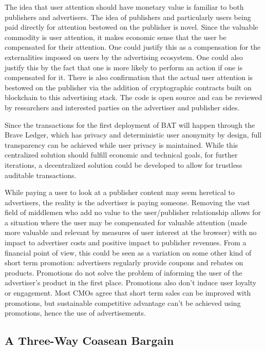 \documentclass[11pt]{article}
\begin{document}
The idea that user attention should have monetary value is familiar to
both publishers and advertisers. The idea of publishers and
particularly users being paid directly for attention bestowed on the
publisher is novel. Since the valuable commodity is user attention, it
makes economic sense that the user be compensated for their
attention. One could justify this as a compensation for the
externalities imposed on users by the advertising ecosystem. One could
also justify this by the fact that one is more likely to perform an
action if one is compensated for it. There is also confirmation that
the actual user attention is bestowed on the publisher via the
addition of cryptographic contracts built on blockchain to this
advertising stack. The code is open source and can be reviewed by
researchers and interested parties on the advertiser and publisher sides.

Since the transactions for the first deployment of \textrm{BAT} will happen
through the Brave Ledger, which has privacy and deterministic user
anonymity by design, full transparency can be achieved while user privacy is maintained. While this 
centralized solution should fulfill economic and technical goals, for further iterations, a 
decentralized solution could be developed to allow for trustless
auditable transactions.

While paying a user to look at a publisher content may seem
heretical to advertisers, the reality is the advertiser is paying
someone. Removing the vast field of middlemen who add no
value to the user/publisher relationship allows for a situation where
the user may be compensated for valuable attention (made more
valuable and relevant by measures of user interest at the browser)
with no impact to advertiser costs and positive impact to publisher
revenues. From a financial point of view, this could be seen as a
variation on some other kind of short term promotion: advertisers
regularly provide coupons and rebates on products. Promotions do not
solve the problem of informing the user of the advertiser's product in
the first place. Promotions also don't induce user loyalty or
engagement. Most CMOs agree that short term sales can be improved with
promotions, but sustainable competitive advantage can't be achieved
using promotions, hence the use of advertisements. 

\subsection{A Three-Way Coasean Bargain}
\label{sec-8-2}
\end{document}
